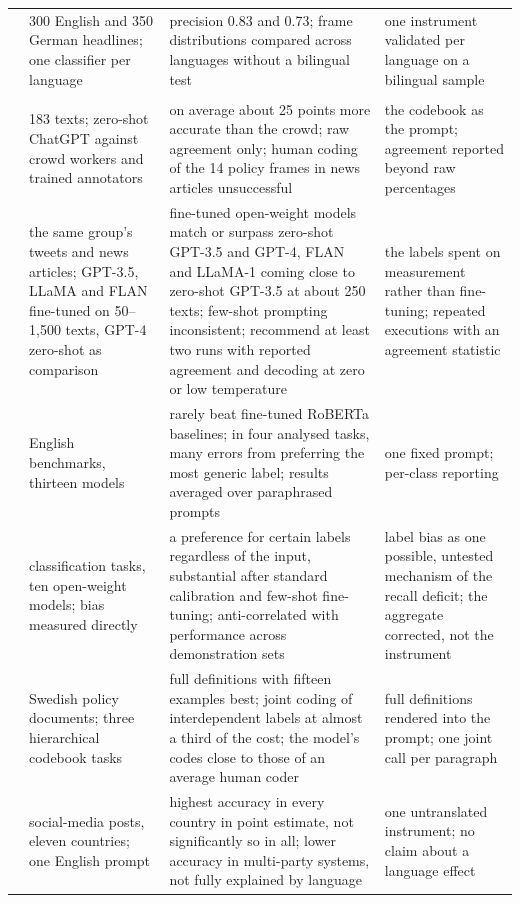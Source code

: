 \begin{longtable}{@{}>{\raggedright\arraybackslash}p{26mm}>{\raggedright\arraybackslash}p{38mm}>{\raggedright\arraybackslash}p{48mm}>{\raggedright\arraybackslash}p{38mm}@{}}
\textcite{guo2023openframing} & 1{,}300 English and 350 German headlines; one classifier per language & precision 0.83 and 0.73; frame distributions compared across languages without a bilingual test & one instrument validated per language on a bilingual sample \\
\addlinespace
\multicolumn{4}{@{}l}{\emph{Large language models as annotators}} \\
\textcite{gilardi2023chatgpt} & 6{,}183 texts; zero-shot ChatGPT against crowd workers and trained annotators & on average about 25 points more accurate than the crowd; raw agreement only; human coding of the 14 policy frames in news articles unsuccessful & the codebook as the prompt; agreement reported beyond raw percentages \\
\textcite{alizadeh2025opensource} & the same group's tweets and news articles; GPT-3.5, LLaMA and FLAN fine-tuned on 50--1{,}500 texts, GPT-4 zero-shot as comparison & fine-tuned open-weight models match or surpass zero-shot GPT-3.5 and GPT-4, FLAN and LLaMA-1 coming close to zero-shot GPT-3.5 at about 250 texts; few-shot prompting inconsistent; recommend at least two runs with reported agreement and decoding at zero or low temperature & the labels spent on measurement rather than fine-tuning; repeated executions with an agreement statistic \\
\textcite{ziems2024css} & 25 English benchmarks, thirteen models & rarely beat fine-tuned RoBERTa baselines; in four analysed tasks, many errors from preferring the most generic label; results averaged over paraphrased prompts & one fixed prompt; per-class reporting \\
\textcite{reif2024labelbias} & 279 classification tasks, ten open-weight models; bias measured directly & a preference for certain labels regardless of the input, substantial after standard calibration and few-shot fine-tuning; anti-correlated with performance across demonstration sets & label bias as one possible, untested mechanism of the recall deficit; the aggregate corrected, not the instrument \\
\textcite{lupo2024humanlevelcoding} & Swedish policy documents; three hierarchical codebook tasks & full definitions with fifteen examples best; joint coding of interdependent labels at almost a third of the cost; the model's codes close to those of an average human coder & full definitions rendered into the prompt; one joint call per paragraph \\
\textcite{toernberg2025outperform} & social-media posts, eleven countries; one English prompt & highest accuracy in every country in point estimate, not significantly so in all; lower accuracy in multi-party systems, not fully explained by language & one untranslated instrument; no claim about a language effect \\

\end{longtable}
